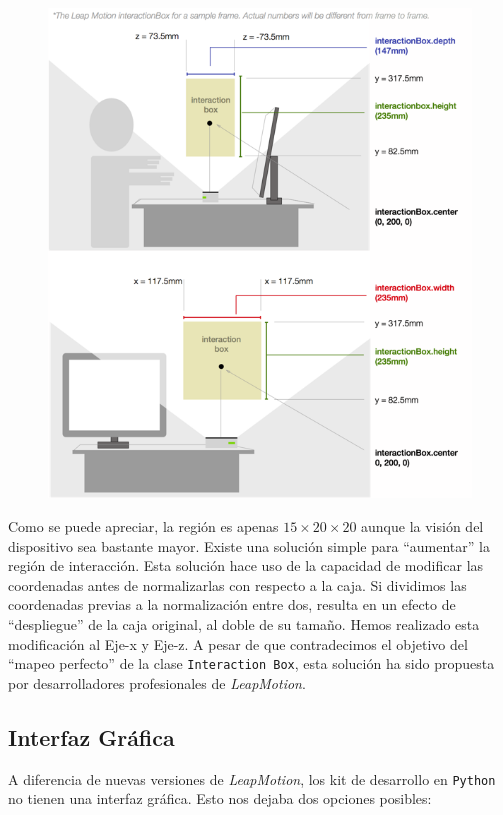 \documentclass[11pt,a4paper]{article}
\begin{document}
\begin{figure}[H]
\centering
\includegraphics[scale=0.5]{img/box.png}
\end{figure}

Como se puede apreciar, la región es apenas $15 \times 20 \times 20$ aunque la visión del dispositivo sea bastante mayor. 
Existe una solución simple para “aumentar” la región de interacción. Esta solución hace uso de la capacidad de modificar las coordenadas antes de normalizarlas
con respecto a la caja. Si dividimos las coordenadas previas a la normalización entre dos, resulta en un efecto de ``despliegue'' de la caja original, al
doble de su tamaño. Hemos realizado esta modificación al Eje-x y Eje-z. A pesar de que contradecimos el objetivo del ``mapeo perfecto'' de la clase
\texttt{Interaction Box}, esta solución ha sido propuesta por desarrolladores profesionales de \textit{LeapMotion}.

\subsection{Interfaz Gráfica}

A diferencia de nuevas versiones de \textit{LeapMotion}, los kit de desarrollo en \texttt{Python} no tienen una interfaz gráfica. Esto nos dejaba dos
opciones posibles:
\end{document}
